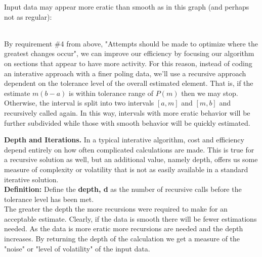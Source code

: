 \documentclass[12pt,a4paper]{report}
\begin{document}

  Input data may appear more eratic than smooth as in this graph (and perhaps not as regular):

\\

By requirement \#4 from above, "Attempts should be made to optimize where the greatest changes occur", we can improve our efficiency by focusing our algorithm on sections that appear to have more activity.  For this reason, instead of coding an interative approach with a finer poling data, we'll use a recursive approach dependent on the tolerance level of the overall estimated element.  That is, if the estimate $m(b-a)$ is within tolerance range of $P(m)$ then we may stop.  Otherwise, the interval is split into two intervals $[a,m]$ and $[m,b]$ and recursively called again.  In this way, intervals with more eratic behavior will be further subdivided while those with smooth behavior will be quickly estimated.\\


\textbf{Depth and Iterations.}  In a typical interative algorithm, cost and efficiency depend entirely on how often complicated calculations are made.  This is true for a recursive solution as well, but an additional value, namely depth, offers us some measure of complexity or volatility that is not as easily available in a standard iterative solution.  \\

\textbf{Definition: } Define the \textbf{depth, d} as the number of recursive calls before the tolerance level has been met.\\

The greater the depth the more recursions were required to make for an acceptable estimate.  Clearly, if the data is smooth there will be fewer estimations needed.  As the data is more eratic more recursions are needed and the depth increases.  By returning the depth of the calculation we get a measure of the "noise" or "level of volatility" of the input data.\\
\end{document}

